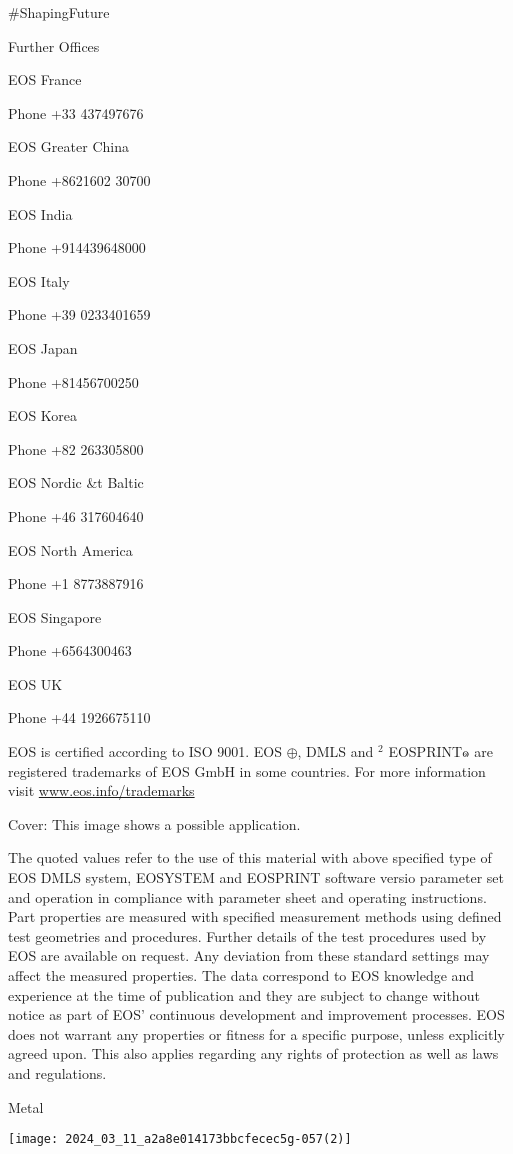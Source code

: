 \documentclass[10pt]{article}
\begin{document}
\#ShapingFuture

Further Offices

EOS France

Phone +33 437497676

EOS Greater China

Phone +8621602 30700

EOS India

Phone +914439648000

EOS Italy

Phone +39 0233401659

EOS Japan

Phone +81456700250

EOS Korea

Phone +82 263305800

EOS Nordic \&t Baltic

Phone +46 317604640

EOS North America

Phone +1 8773887916

EOS Singapore

Phone +6564300463

EOS UK

Phone +44 1926675110

EOS is certified according to ISO 9001. EOS $\oplus$, DMLS and $^{2}$ EOSPRINT๑ are registered trademarks of EOS GmbH in some countries. For more information visit \href{http://www.eos.info/trademarks}{www.eos.info/trademarks}

Cover: This image shows a possible application.

The quoted values refer to the use of this material with above specified type of EOS DMLS system, EOSYSTEM and EOSPRINT software versio parameter set and operation in compliance with parameter sheet and operating instructions. Part properties are measured with specified measurement methods using defined test geometries and procedures. Further details of the test procedures used by EOS are available on request. Any deviation from these standard settings may affect the measured properties. The data correspond to EOS knowledge and experience at the time of publication and they are subject to change without notice as part of EOS' continuous development and improvement processes. EOS does not warrant any properties or fitness for a specific purpose, unless explicitly agreed upon. This also applies regarding any rights of protection as well as laws and regulations.

Metal

\begin{center}
\texttt{[image: 2024\_03\_11\_a2a8e014173bbcfecec5g-057(2)]}
\end{center}
\end{document}
